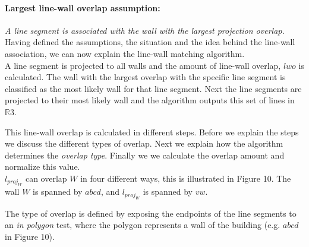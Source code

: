 	\paragraph{Largest line-wall overlap assumption:}
	\emph{A line segment is associated with the wall with the largest projection
	overlap.}\\
	Having defined the assumptions, the situation and the idea behind the
	line-wall association, we can now explain the line-wall matching algorithm.\\ 

	A line segment is projected to all walls and the amount of line-wall
	overlap, $lwo$ is calculated. The wall with the largest overlap with the specific line
segment is classified as the most likely wall for that line segment.
	Next the line segments are projected to their most likely wall and the
	algorithm outputs this set of lines in $\mathbb{R}3$. 
	

	This line-wall overlap is calculated in different steps.
	Before we explain the steps we discuss the different types of overlap. Next
	we explain how the algorithm determines the \emph{overlap type}. Finally we
	we calculate the overlap amount and normalize this value.\\

	$l_{proj_W}$ can overlap $W$ in four different ways, this is illustrated 
	in Figure 10. The wall $W$ is spanned by $abcd$, and $l_{proj_W}$ is spanned
	by $vw$.
	
		
	\clearpage


	The type of overlap is defined by exposing the endpoints of the line
	segments to an \emph{in polygon} test, where the polygon represents a 
	wall of the building (e.g. $abcd$ in Figure 10).

